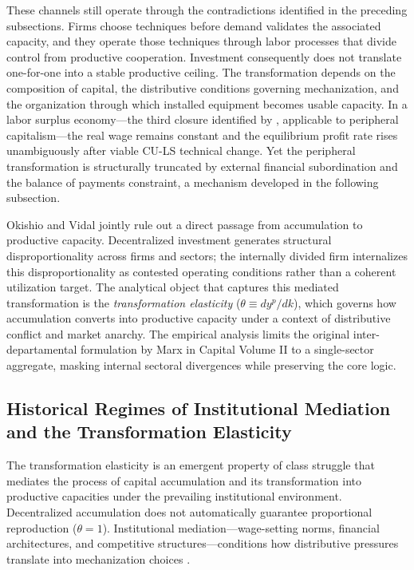 These channels still operate through the contradictions
identified in the preceding subsections. Firms choose techniques
before demand validates the associated capacity, and they
operate those techniques through labor processes that divide
control from productive cooperation. Investment consequently
does not translate one-for-one into a stable productive ceiling.
The transformation depends on the composition of capital, the
distributive conditions governing mechanization, and the
organization through which installed equipment becomes usable
capacity. In a labor surplus economy---the third closure
identified by \citet{Basu2026}, applicable to peripheral
capitalism---the real wage remains constant and the equilibrium
profit rate rises unambiguously after viable CU-LS technical
change. Yet the peripheral transformation is structurally
truncated by external financial subordination and the balance of
payments constraint, a mechanism developed in the following
subsection.

Okishio and Vidal jointly rule out a direct
passage from accumulation to productive capacity.
Decentralized investment generates structural
disproportionality across firms and sectors; the internally
divided firm internalizes this disproportionality as
contested operating conditions rather than a coherent
utilization target. The analytical object that captures this
mediated transformation is the \textit{transformation elasticity} ($\theta \equiv d y^p / d k$), which governs how
accumulation converts into productive capacity under a context of
distributive conflict and market anarchy. The empirical
analysis limits the original inter-departamental formulation by Marx in Capital Volume II to a
single-sector aggregate, masking internal sectoral
divergences while preserving the core logic.

\subsection{Historical Regimes of Institutional Mediation and the Transformation Elasticity}

The transformation elasticity is an emergent property of class struggle 
that mediates the process of capital accumulation and its transformation 
into productive capacities under the prevailing institutional environment.
Decentralized accumulation does not automatically guarantee
proportional reproduction ($\theta = 1$). Institutional
mediation---wage-setting norms, financial architectures, and
competitive structures---conditions how distributive pressures
translate into mechanization choices
\citep{Aglietta2000}. 

